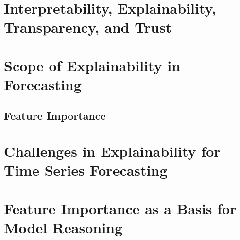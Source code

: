 


\section{Interpretability, Explainability, Transparency, and Trust}
\label{sec:interpretability_explainability}


\section{Scope of Explainability in Forecasting}
\label{sec:scope_explainability}

\subsection{Feature Importance}
\section{Challenges in Explainability for Time Series Forecasting}
\section{Feature Importance as a Basis for Model Reasoning}


